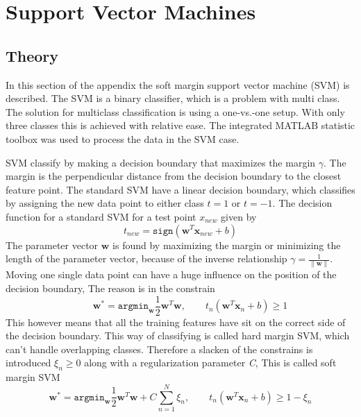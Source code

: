 \chapter{Support Vector Machines}
\section{Theory}

In this section of the appendix the soft margin support vector machine (SVM) is described. The SVM is a binary classifier, which is a problem with multi class. 
The solution for multiclass classification is using a one-vs.-one setup.
With only three classes this is achieved with relative ease. 
The integrated MATLAB statistic toolbox was used to process the data in the SVM case. 

SVM classify by making a decision boundary that maximizes the margin $ \gamma $.
The margin is the perpendicular distance from the decision boundary to the closest feature point.
The standard SVM have a linear decision boundary, which classifies by assigning the new data point to either class $ t=1 $ or $ t=-1 $. 
The decision function for a standard SVM for a test point $ x_{new} $ given by
\begin{equation}
t_{new} = \mathtt{sign}(\mathbf{w}^T \mathbf{x}_{new} +b)
\label{eq:SVM_lin}
\end{equation}
The parameter vector $ \mathbf{w} $ is found by maximizing the margin or minimizing the length of the parameter vector, because of the inverse relationship $ \gamma = \frac{1}{\|\mathbf{w}\|} $.
Moving one single data point can have a huge influence on the position of the decision boundary, The reason is in the constrain
\begin{equation}
\qquad \mathbf{w}^* =
\mathtt{argmin}_\mathbf{w} \frac{1}{2} \mathbf{w}^T \mathbf{w}, 
\qquad t_n(\mathbf{w}^T \mathbf{x}_n + b) \geq 1
\end{equation}   
This however means that all the training features have sit on the correct side of the decision boundary.
This way of classifying is called hard margin SVM, which can't handle overlapping classes.
Therefore a slacken of the constrains is introduced $ \xi_n \geq 0 $ along with a regularization parameter \textit{C}, This is called soft margin SVM
\begin{equation}
\mathbf{w}^* = 
\mathtt{argmin}_\mathbf{w} \frac{1}{2} \mathbf{w}^T \mathbf{w}+C \sum_{n=1}^{N} \xi_n, \qquad t_n(\mathbf{w}^T \mathbf{x}_n + b) \geq 1-\xi_n
\end{equation} 
